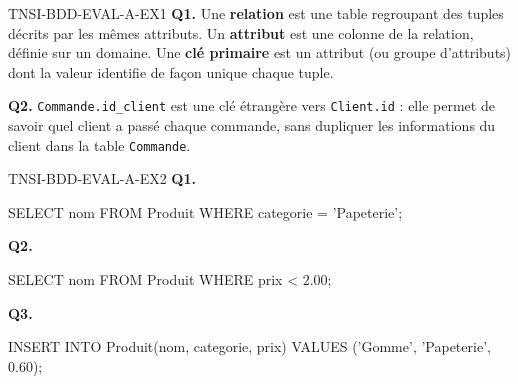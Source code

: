 \begin{corrige}{TNSI-BDD-EVAL-A-EX1}
\textbf{Q1.} Une \textbf{relation} est une table regroupant des tuples décrits par les mêmes attributs. Un \textbf{attribut} est une colonne de la relation, définie sur un domaine. Une \textbf{clé primaire} est un attribut (ou groupe d'attributs) dont la valeur identifie de façon unique chaque tuple.

\textbf{Q2.} \texttt{Commande.id\_client} est une clé étrangère vers \texttt{Client.id} : elle permet de savoir quel client a passé chaque commande, sans dupliquer les informations du client dans la table \texttt{Commande}.
\end{corrige}

\begin{corrige}{TNSI-BDD-EVAL-A-EX2}
\textbf{Q1.}
\begin{sql}
SELECT nom FROM Produit WHERE categorie = 'Papeterie';
\end{sql}

\textbf{Q2.}
\begin{sql}
SELECT nom FROM Produit WHERE prix < 2.00;
\end{sql}

\textbf{Q3.}
\begin{sql}
INSERT INTO Produit(nom, categorie, prix) VALUES ('Gomme', 'Papeterie', 0.60);
\end{sql}
\end{corrige}
